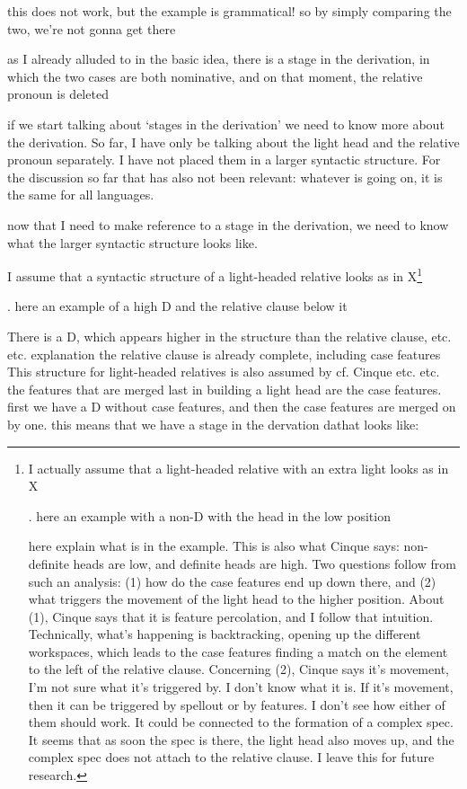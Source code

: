 this does not work, but the example is grammatical!
so by simply comparing the two, we're not gonna get there

as I already alluded to in the basic idea, there is a stage in the derivation, in which the two cases are both nominative, and on that moment, the relative pronoun is deleted

if we start talking about `stages in the derivation' we need to know more about the derivation.
So far, I have only be talking about the light head and the relative pronoun separately. I have not placed them in a larger syntactic structure. For the discussion so far that has also not been relevant: whatever is going on, it is the same for all languages.

now that I need to make reference to a stage in the derivation, we need to know what the larger syntactic structure looks like.

I assume that a syntactic structure of a light-headed relative looks as in X\footnote{
I actually assume that a light-headed relative with an extra light looks as in X

\ex. here an example with a non-D with the head in the low position

here explain what is in the example.
This is also what Cinque says: non-definite heads are low, and definite heads are high.
Two questions follow from such an analysis: (1) how do the case features end up down there, and (2) what triggers the movement of the light head to the higher position. About (1), Cinque says that it is feature percolation, and I follow that intuition. Technically, what's happening is backtracking, opening up the different workspaces, which leads to the case features finding a match on the element to the left of the relative clause. Concerning (2), Cinque says it's movement, I'm not sure what it's triggered by. I don't know what it is. If it's movement, then it can be triggered by spellout or by features. I don't see how either of them should work. It could be connected to the formation of a complex spec. It seems that as soon the spec is there, the light head also moves up, and the complex spec does not attach to the relative clause. I leave this for future research.
}

\ex. here an example of a high D and the relative clause below it

There is a D, which appears higher in the structure than the relative clause, etc. etc. explanation
the relative clause is already complete, including case features
This structure for light-headed relatives is also assumed by cf. Cinque etc. etc.
the features that are merged last in building a light head are the case features. first we have a D without case features, and then the case features are merged on by one. this means that we have a stage in the dervation dathat looks like:

